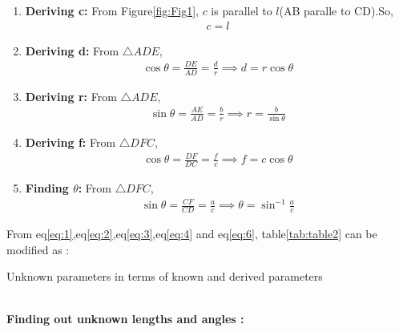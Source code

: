 \documentclass{article}
\begin{document}
\begin{enumerate}
	\item \textbf{Deriving c:}
		From Figure\ref{fig:Fig1}, $c$ is  parallel to $l$(AB paralle to CD).So,
		\begin{align}
			c = l
			\label{eq:1}
		\end{align}
	\item \textbf{Deriving d:}
		From $\triangle{ADE}$,
		\begin{align}
			\cos{\theta} = \frac{DE}{AD} = \frac{d}{r}
			\implies d = r\cos{\theta}
			\label{eq:2}
		\end{align}
	\item \textbf{Deriving r:}
		From $\triangle{ADE}$,
		\begin{align}
			\sin{\theta} = \frac{AE}{AD} = \frac{b}{r}
			\implies r = \frac{b}{\sin{\theta}}
			\label{eq:3}
		\end{align}
	\item \textbf{Deriving f:}
		From $\triangle{DFC}$,
		\begin{align}
			\cos{\theta} = \frac{DF}{DC} = \frac{f}{c}
			\implies f = c\cos{\theta}
			\label{eq:4}
		\end{align}
	\item \textbf{Finding $\theta$:}
		From $\triangle{DFC}$,
		\begin{align}
			\sin{\theta} = \frac{CF}{CD} = \frac{a}{c}
			\implies \theta = \sin^{-1}\frac{a}{c}
			\label{eq:6}
		\end{align}
\end{enumerate}
From eq\ref{eq:1},eq\ref{eq:2},eq\ref{eq:3},eq\ref{eq:4} and eq\ref{eq:6}, table\ref{tab:table2} can be modified as :\\
\begin{table}[h]
	\centering
	
	\caption{Unknown parameters in terms of known and derived parameters}
	\label{tab:table4}
\end{table}\\
\textbf{Finding out unknown lengths and angles :}\\
\end{document}
